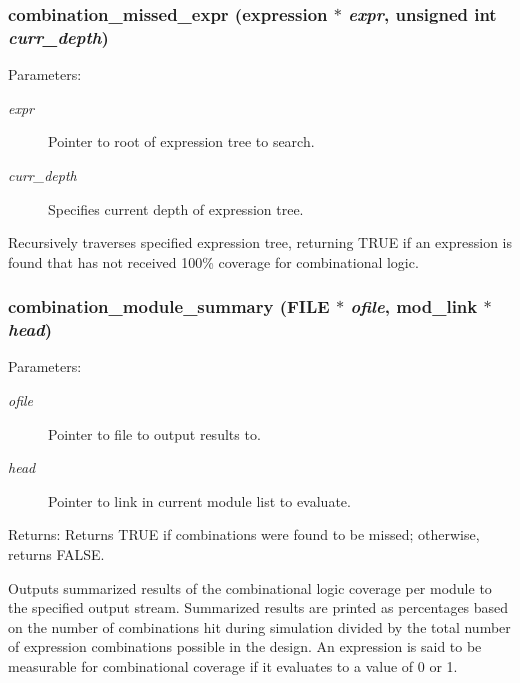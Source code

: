 \subsubsection{ combination\_\-missed\_\-expr ({\bf expression} $\ast$ {\em expr}, unsigned int {\em curr\_\-depth})}\label{comb_8c_a16}


\begin{Desc}
\item[Parameters:]
\begin{description}
\item[{\em expr}]Pointer to root of expression tree to search. \item[{\em curr\_\-depth}]Specifies current depth of expression tree.\end{description}
\end{Desc}
Recursively traverses specified expression tree, returning TRUE if an expression is found that has not received 100\% coverage for combinational logic. 
\subsubsection{ combination\_\-module\_\-summary (FILE $\ast$ {\em ofile}, {\bf mod\_\-link} $\ast$ {\em head})}\label{comb_8c_a9}


\begin{Desc}
\item[Parameters:]
\begin{description}
\item[{\em ofile}]Pointer to file to output results to. \item[{\em head}]Pointer to link in current module list to evaluate.\end{description}
\end{Desc}
\begin{Desc}
\item[Returns:]Returns TRUE if combinations were found to be missed; otherwise, returns FALSE.\end{Desc}
Outputs summarized results of the combinational logic coverage per module to the specified output stream. Summarized results are printed as percentages based on the number of combinations hit during simulation divided by the total number of expression combinations possible in the design. An expression is said to be measurable for combinational coverage if it evaluates to a value of 0 or 1. 

